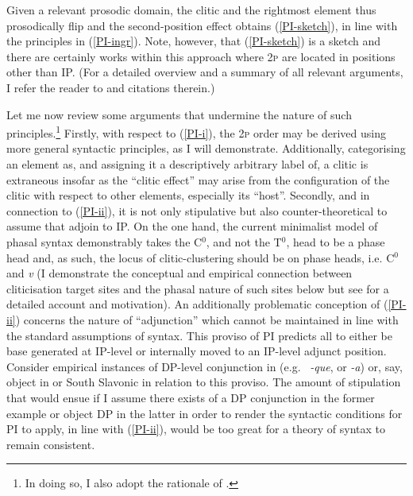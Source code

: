 \documentclass[output=paper]{langsci/langscibook}
\begin{document}
Given a relevant prosodic domain, the clitic and the rightmost element thus
prosodically flip and the second-position effect obtains (\ref{PI-sketch}), in
line with the principles in (\ref{PI-ingr}). Note, however, that
(\ref{PI-sketch}) is a sketch and there are certainly works within this
approach where \textsc{2p}  are located in positions other than
IP. (For a detailed overview and a summary of all relevant arguments, I refer
the reader to \citealt[75ff]{Boskovic:2001b} and citations therein.)

Let me now review some arguments that undermine the nature of such
principles.\footnote{In doing so, I also adopt the rationale of
\citet[422]{roberts:2012uq}.} Firstly, with respect to (\ref{PI-i}), the
\textsc{2p} order may be derived using more general syntactic principles, as  I
will demonstrate. Additionally, categorising an element as, and assigning it a
descriptively arbitrary label of, a clitic is extraneous insofar as the
\enquote{clitic effect} may arise from the configuration of the clitic with
respect to other elements, especially its \enquote{host}. Secondly, and in
connection to (\ref{PI-ii}), it is not only stipulative but also
counter-theoretical to assume that  adjoin to IP. On the one hand, the
current minimalist  model of phasal syntax demonstrably takes the C$^0$, and
not the T$^0$, head to be a phase head and, as such, the locus of
clitic-clustering should be on phase heads, i.e. C$^0$ and \emph{v} (I
demonstrate the conceptual and empirical connection between cliticisation
target sites and the phasal nature of such sites below but see
\citet{Roberts2010,roberts:2012uq} for a detailed account and motivation).  An
additionally problematic conception of (\ref{PI-ii}) concerns the nature of
\enquote{adjunction} which cannot be maintained in line with the standard
assumptions of syntax. This proviso of \gls{PI} predicts all  to either
be base generated at IP-level or internally moved to an IP-level adjunct
position.  Consider empirical instances of DP-level conjunction  in
 (e.g.\  \emph{-que}, or  \emph{-a}) or, say, object
 in  or South Slavonic in relation to this proviso. The amount of
stipulation that would ensue if I assume there exists  of a DP
conjunction in the former example or object DP in the latter in order to render
the syntactic conditions for \gls{PI} to apply, in line with (\ref{PI-ii}),
would be too great for a theory of syntax to remain consistent.
\end{document}
